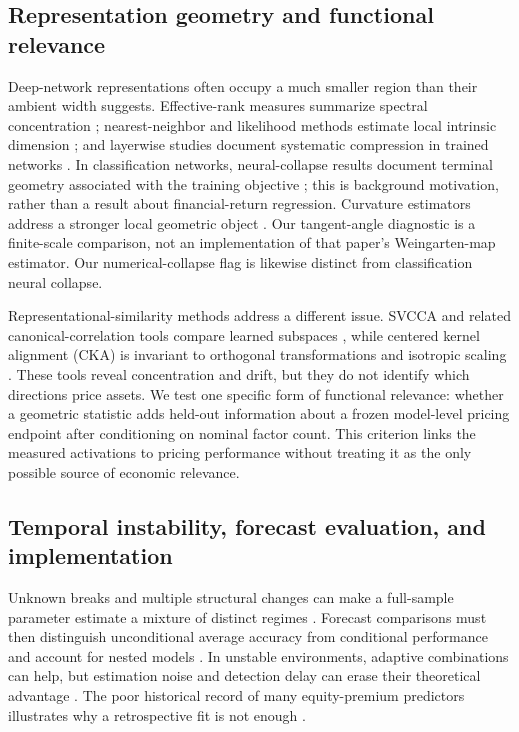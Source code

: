\subsection{Representation geometry and functional relevance}

Deep-network representations often occupy a much smaller region than their ambient width suggests. Effective-rank measures summarize spectral concentration \citep{roy2007rank}; nearest-neighbor and likelihood methods estimate local intrinsic dimension \citep{levina2005mle,facco2017twonn}; and layerwise studies document systematic compression in trained networks \citep{ansuini2019intrinsic}. In classification networks, neural-collapse results document terminal geometry associated with the training objective \citep{papyan2020collapse}; this is background motivation, rather than a result about financial-return regression. Curvature estimators address a stronger local geometric object \citep{cao2021curvature}. Our tangent-angle diagnostic is a finite-scale comparison, not an implementation of that paper's Weingarten-map estimator. Our numerical-collapse flag is likewise distinct from classification neural collapse.

Representational-similarity methods address a different issue. SVCCA and related canonical-correlation tools compare learned subspaces \citep{raghu2017svcca,morcos2018cca}, while centered kernel alignment (CKA) is invariant to orthogonal transformations and isotropic scaling \citep{kornblith2019similarity}. These tools reveal concentration and drift, but they do not identify which directions price assets. We test one specific form of functional relevance: whether a geometric statistic adds held-out information about a frozen model-level pricing endpoint after conditioning on nominal factor count. This criterion links the measured activations to pricing performance without treating it as the only possible source of economic relevance.

\subsection{Temporal instability, forecast evaluation, and implementation}

Unknown breaks and multiple structural changes can make a full-sample parameter estimate a mixture of distinct regimes \citep{andrews1993instability,bai1998breaks}. Forecast comparisons must then distinguish unconditional average accuracy from conditional performance and account for nested models \citep{diebold1995accuracy,clark2001nested,giacomini2006conditional}. In unstable environments, adaptive combinations can help, but estimation noise and detection delay can erase their theoretical advantage \citep{elliott2004combinations,giacomini2010unstable,smith2021break}. The poor historical record of many equity-premium predictors illustrates why a retrospective fit is not enough \citep{welch2008equity}.

